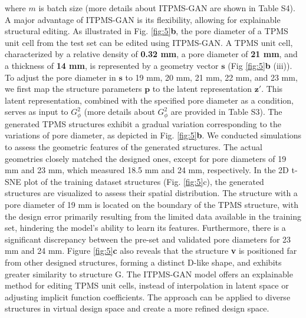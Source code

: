 \documentclass[preprint,review,12pt,authoryear]{elsarticle}
\begin{document}
where $m$ is batch size (more details about ITPMS-GAN are shown in Table S4). A major advantage of ITPMS-GAN is its flexibility, allowing for explainable structural editing. As illustrated in Fig. \ref{fig:5}\textbf{b}, the pore diameter of a TPMS unit cell from the test set can be edited using ITPMS-GAN. A TPMS unit cell, characterized by a relative density of\textbf{ 0.32 mm}, a pore diameter of \textbf{21 mm}, and a thickness of \textbf{14 mm}, is represented by a geometry vector $\boldsymbol{s}$ (Fig \ref{fig:5}\textbf{b} (iii)). To adjust the pore diameter in $\boldsymbol{s}$ to 19 mm, 20 mm, 21 mm, 22 mm, and 23 mm, we first map the structure parameters $\boldsymbol{p}$ to the latent representation $\boldsymbol{z}'$. This latent representation, combined with the specified pore diameter as a condition, serves as input to $G_\phi^2$ (more details about $G^2_\phi$ are provided in Table S3). The generated TPMS structures exhibit a gradual variation corresponding to the variations of pore diameter, as depicted in Fig. \ref{fig:5}\textbf{b}. We conducted simulations to assess the geometric features of the generated structures. The actual geometries closely matched the designed ones, except for pore diameters of 19 mm and 23 mm, which measured 18.5 mm and 24 mm, respectively. In the 2D t-SNE plot of the training dataset structures (Fig. \ref{fig:5}c), the generated structures are visualized to assess their spatial distribution. The structure with a pore diameter of 19 mm is located on the boundary of the TPMS structure, with the design error primarily resulting from the limited data available in the training set, hindering the model's ability to learn its features. Furthermore, there is a significant discrepancy between the pre-set and validated pore diameters for 23 mm and 24 mm. Figure \ref{fig:5}\textbf{c} also reveals that the structure \textbf{v} is positioned far from other designed structures, forming a distinct D-like shape, and exhibits greater similarity to structure G. The ITPMS-GAN model offers an explainable method for editing TPMS unit cells, instead of interpolation in latent space or adjusting implicit function coefficients. The approach can be applied to diverse structures in virtual design space and create a more refined design space.
\end{document}
